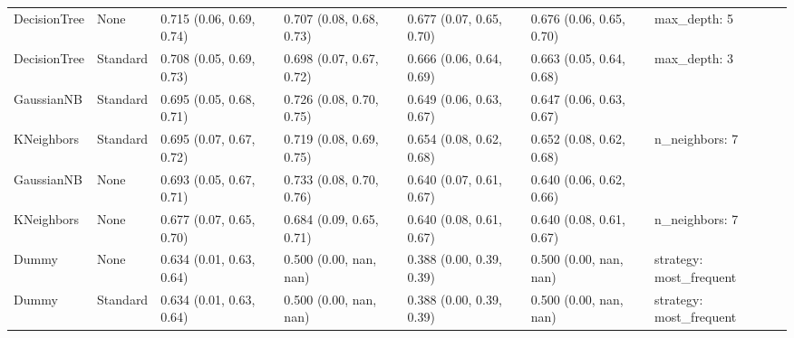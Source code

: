 \begin{tabular}{lllllll}
DecisionTree & None & 0.715 (0.06, 0.69, 0.74) & 0.707 (0.08, 0.68, 0.73) & 0.677 (0.07, 0.65, 0.70) & 0.676 (0.06, 0.65, 0.70) & {{max\_depth: 5}} \\
DecisionTree & Standard & 0.708 (0.05, 0.69, 0.73) & 0.698 (0.07, 0.67, 0.72) & 0.666 (0.06, 0.64, 0.69) & 0.663 (0.05, 0.64, 0.68) & {{max\_depth: 3}} \\
GaussianNB & Standard & 0.695 (0.05, 0.68, 0.71) & 0.726 (0.08, 0.70, 0.75) & 0.649 (0.06, 0.63, 0.67) & 0.647 (0.06, 0.63, 0.67) & {{}} \\
KNeighbors & Standard & 0.695 (0.07, 0.67, 0.72) & 0.719 (0.08, 0.69, 0.75) & 0.654 (0.08, 0.62, 0.68) & 0.652 (0.08, 0.62, 0.68) & {{n\_neighbors: 7}} \\
GaussianNB & None & 0.693 (0.05, 0.67, 0.71) & 0.733 (0.08, 0.70, 0.76) & 0.640 (0.07, 0.61, 0.67) & 0.640 (0.06, 0.62, 0.66) & {{}} \\
KNeighbors & None & 0.677 (0.07, 0.65, 0.70) & 0.684 (0.09, 0.65, 0.71) & 0.640 (0.08, 0.61, 0.67) & 0.640 (0.08, 0.61, 0.67) & {{n\_neighbors: 7}} \\
Dummy & None & 0.634 (0.01, 0.63, 0.64) & 0.500 (0.00, nan, nan) & 0.388 (0.00, 0.39, 0.39) & 0.500 (0.00, nan, nan) & {{strategy: most\_frequent}} \\
Dummy & Standard & 0.634 (0.01, 0.63, 0.64) & 0.500 (0.00, nan, nan) & 0.388 (0.00, 0.39, 0.39) & 0.500 (0.00, nan, nan) & {{strategy: most\_frequent}} \\
\bottomrule
\end{tabular}
